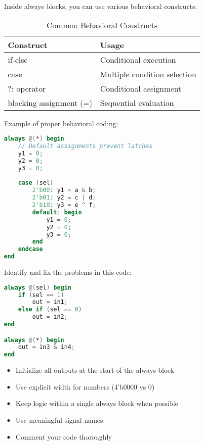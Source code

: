 \documentclass[12pt]{labmanual}
\begin{document}
Inside always blocks, you can use various behavioral constructs:

\begin{table}[H]
    \centering
    \begin{tabular}{|l|l|}
    \hline
    \textbf{Construct} & \textbf{Usage} \\
    \hline
    if-else & Conditional execution \\
    case & Multiple condition selection \\
    ?: operator & Conditional assignment \\
    blocking assignment (=) & Sequential evaluation \\
    \hline
    \end{tabular}
    \caption{Common Behavioral Constructs}
    \label{tab:constructs}
\end{table}

Example of proper behavioral coding:
\begin{lstlisting}[language=verilog]
always @(*) begin
    // Default assignments prevent latches
    y1 = 0;
    y2 = 0;
    y3 = 0;
    
    case (sel)
        2'b00: y1 = a & b;
        2'b01: y2 = c | d;
        2'b10: y3 = e ^ f;
        default: begin
            y1 = 0;
            y2 = 0;
            y3 = 0;
        end
    endcase
end
\end{lstlisting}

\begin{question}
Identify and fix the problems in this code:
\begin{lstlisting}[language=verilog]
always @(sel) begin
    if (sel == 1)
        out = in1;
    else if (sel == 0)
        out = in2;
end

always @(*) begin
    out = in3 & in4;
end
\end{lstlisting}
\end{question}

\begin{extra}[frametitle={Design Guidelines}]
\begin{itemize}
    \item Initialize all outputs at the start of the always block
    \item Use explicit width for numbers (4'b0000 vs 0)
    \item Keep logic within a single always block when possible
    \item Use meaningful signal names
    \item Comment your code thoroughly
\end{itemize}
\end{extra}
\end{document}
